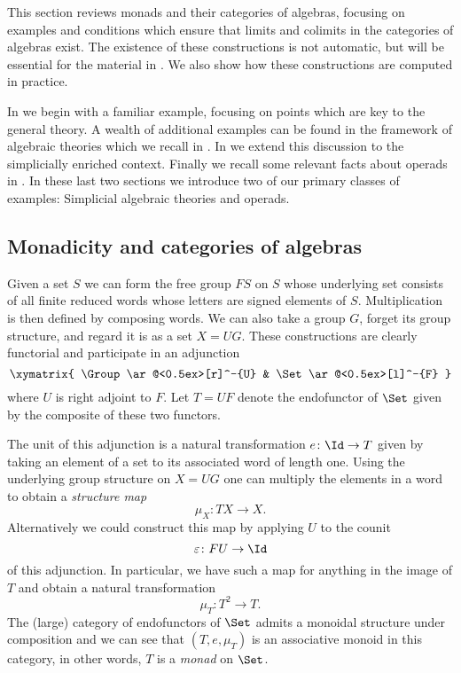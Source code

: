 \documentclass[leqno,oneside,english]{elsarticle}
\begin{document}
This section reviews monads and their categories of algebras, focusing
on examples and conditions which ensure that limits and colimits in the
categories of algebras exist. The existence of these constructions is
not automatic, but will be essential for the material in
.  We also show how these constructions are
computed in practice.

In  we begin with a familiar example, focusing on
points which are key to the general theory. A wealth of additional
examples can be found in the framework of algebraic theories which we
recall in . In 
we extend this discussion to the simplicially enriched
context. Finally we recall some relevant facts about operads in 
. In these last two sections we introduce
two of our primary classes of examples: Simplicial algebraic theories
and operads.

\subsection{Monadicity and categories of algebras}\label{sec:monads}
Given a set $S$ we can form the free group $FS$ on $S$ whose
underlying set consists of all finite reduced words whose letters are
signed elements of $S$. 
Multiplication is then defined by composing words. We can also take a group
$G$, forget its group structure, and regard it is as a set $X=UG$. These
constructions are clearly functorial and participate in an adjunction 
\begin{equation*}
   \xymatrix{
   \Group\ar@<0.5ex>[r]^-{U}  & \Set\ar@<0.5ex>[l]^-{F}
 }
\end{equation*}
where $U$ is right adjoint to $F$. Let $T=UF$ denote
the endofunctor of $\Set$ given by the composite of these two functors.

The unit of this adjunction is a natural transformation
$e\colon \Id\rightarrow T$ given by taking an element of a
set to its associated word of length one. Using the underlying
group structure on $X=UG$ one can multiply the elements in a word to obtain
a \emph{structure map} 
\[
  \mu_{X}\colon TX\rightarrow X.
\] 
Alternatively we could construct this map by applying $U$ to the counit
\[
  \varepsilon\colon FU\rightarrow \Id
\] 
of this adjunction. In particular, we have such a map for anything in the
image of $T$ and obtain a natural transformation 
\[
  \mu_T\colon T^2\rightarrow T.
\] 
The (large) category of
endofunctors of $\Set$ admits a monoidal structure under composition and
we can see that $(T, e, \mu_T)$ is an associative monoid in this category,
in other words, $T$ is a \emph{monad} on $\Set$. 
\end{document}
